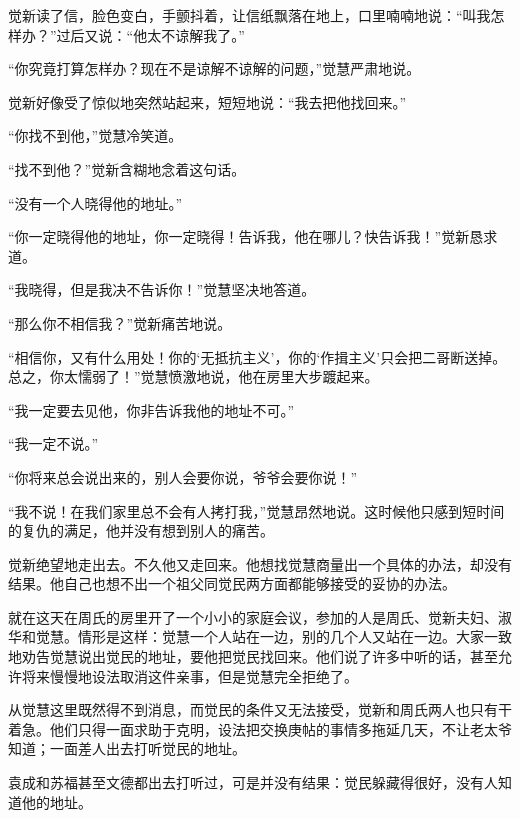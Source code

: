 \par 觉新读了信，脸色变白，手颤抖着，让信纸飘落在地上，口里喃喃地说：“叫我怎样办？”过后又说：“他太不谅解我了。”
\par “你究竟打算怎样办？现在不是谅解不谅解的问题，”觉慧严肃地说。
\par 觉新好像受了惊似地突然站起来，短短地说：“我去把他找回来。”
\par “你找不到他，”觉慧冷笑道。
\par “找不到他？”觉新含糊地念着这句话。
\par “没有一个人晓得他的地址。”
\par “你一定晓得他的地址，你一定晓得！告诉我，他在哪儿？快告诉我！”觉新恳求道。
\par “我晓得，但是我决不告诉你！”觉慧坚决地答道。
\par “那么你不相信我？”觉新痛苦地说。
\par “相信你，又有什么用处！你的‘无抵抗主义’，你的‘作揖主义’只会把二哥断送掉。总之，你太懦弱了！”觉慧愤激地说，他在房里大步踱起来。
\par “我一定要去见他，你非告诉我他的地址不可。”
\par “我一定不说。”
\par “你将来总会说出来的，别人会要你说，爷爷会要你说！”
\par “我不说！在我们家里总不会有人拷打我，”觉慧昂然地说。这时候他只感到短时间的复仇的满足，他并没有想到别人的痛苦。
\par 觉新绝望地走出去。不久他又走回来。他想找觉慧商量出一个具体的办法，却没有结果。他自己也想不出一个祖父同觉民两方面都能够接受的妥协的办法。
\par 就在这天在周氏的房里开了一个小小的家庭会议，参加的人是周氏、觉新夫妇、淑华和觉慧。情形是这样：觉慧一个人站在一边，别的几个人又站在一边。大家一致地劝告觉慧说出觉民的地址，要他把觉民找回来。他们说了许多中听的话，甚至允许将来慢慢地设法取消这件亲事，但是觉慧完全拒绝了。
\par 从觉慧这里既然得不到消息，而觉民的条件又无法接受，觉新和周氏两人也只有干着急。他们只得一面求助于克明，设法把交换庚帖的事情多拖延几天，不让老太爷知道；一面差人出去打听觉民的地址。
\par 袁成和苏福甚至文德都出去打听过，可是并没有结果：觉民躲藏得很好，没有人知道他的地址。
